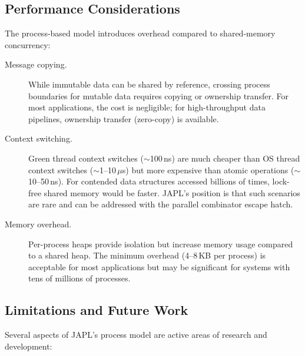 \documentclass[11pt,a4paper]{article}
\begin{document}
\subsection{Performance Considerations}

The process-based model introduces overhead compared to shared-memory concurrency:

\begin{description}
\item[Message copying.] While immutable data can be shared by reference, crossing process boundaries for mutable data requires copying or ownership transfer. For most applications, the cost is negligible; for high-throughput data pipelines, ownership transfer (zero-copy) is available.

\item[Context switching.] Green thread context switches ($\sim$100\,ns) are much cheaper than OS thread context switches ($\sim$1--10\,$\mu$s) but more expensive than atomic operations ($\sim$10--50\,ns). For contended data structures accessed billions of times, lock-free shared memory would be faster. JAPL's position is that such scenarios are rare and can be addressed with the parallel combinator escape hatch.

\item[Memory overhead.] Per-process heaps provide isolation but increase memory usage compared to a shared heap. The minimum overhead (4--8\,KB per process) is acceptable for most applications but may be significant for systems with tens of millions of processes.
\end{description}

\subsection{Limitations and Future Work}

Several aspects of JAPL's process model are active areas of research and development:
\end{document}
